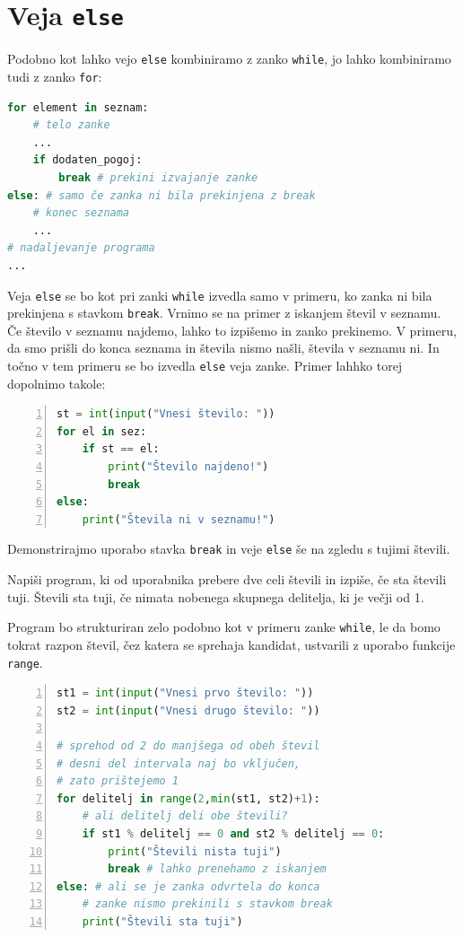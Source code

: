 \section{Veja \texttt{else}}

Podobno kot lahko vejo \texttt{else} kombiniramo z zanko \texttt{while}, jo lahko kombiniramo tudi z zanko \texttt{for}:
\begin{lstlisting}[language=Python]
for element in seznam:
    # telo zanke
    ...
    if dodaten_pogoj:
        break # prekini izvajanje zanke
else: # samo če zanka ni bila prekinjena z break
    # konec seznama
    ...
# nadaljevanje programa
...
\end{lstlisting}

Veja \texttt{else} se bo kot pri zanki \texttt{while} izvedla samo v primeru, ko zanka ni bila prekinjena s stavkom \texttt{break}. Vrnimo se na primer z iskanjem števil v seznamu. Če število v seznamu najdemo, lahko to izpišemo in zanko prekinemo. V primeru, da smo prišli do konca seznama in števila nismo našli, števila v seznamu ni. In točno v tem primeru se bo izvedla \texttt{else} veja zanke. Primer lahhko torej dopolnimo takole:
\begin{lstlisting}[language=Python,numbers=left]
st = int(input("Vnesi število: "))
for el in sez:
    if st == el:
        print("Število najdeno!")
        break
else:
    print("Števila ni v seznamu!")
\end{lstlisting}

Demonstrirajmo uporabo stavka \texttt{break} in veje \texttt{else} še na zgledu s tujimi števili.

\begin{zgled}
Napiši program, ki od uporabnika prebere dve celi števili in izpiše, če sta števili tuji. Števili sta tuji, če nimata nobenega skupnega delitelja, ki je večji od 1.
\end{zgled}
\begin{resitev}
Program bo strukturiran zelo podobno kot v primeru zanke \texttt{while}, le da bomo tokrat razpon števil, čez katera se sprehaja kandidat, ustvarili z uporabo funkcije \texttt{range}. 

\begin{lstlisting}[language=Python,numbers=left]
st1 = int(input("Vnesi prvo število: "))
st2 = int(input("Vnesi drugo število: "))

# sprehod od 2 do manjšega od obeh števil
# desni del intervala naj bo vključen,
# zato prištejemo 1
for delitelj in range(2,min(st1, st2)+1):
    # ali delitelj deli obe števili?
    if st1 % delitelj == 0 and st2 % delitelj == 0:
        print("Števili nista tuji")
        break # lahko prenehamo z iskanjem
else: # ali se je zanka odvrtela do konca
    # zanke nismo prekinili s stavkom break
    print("Števili sta tuji")
\end{lstlisting}
\end{resitev}


